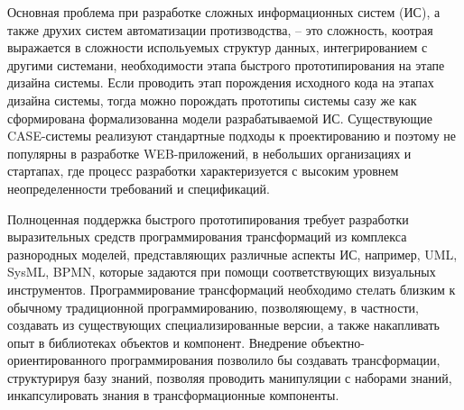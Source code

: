 \documentclass[conference]{IEEEtran} \IEEEoverridecommandlockouts
\begin{document}
Основная проблема при разработке сложных информационных систем (ИС), а также друхих систем автоматизации протизводства, -- это сложность, коотрая выражается в сложности испольуемых структур данных, интегрированием с другими системани, необходимости этапа быстрого прототипирования на этапе дизайна системы. Если проводить этап порождения исходного кода на этапах дизайна системы, тогда можно порождать прототипы системы сазу же как сформирована формализованна модели разрабатываемой ИС. Существующие CASE-системы реализуют стандартные подходы к проектированию и поэтому не популярны в разработке WEB-приложений, в небольших организациях и стартапах, где процесс разработки характеризуется с высоким уровнем неопределенности требований и спецификаций.

Полноценная поддержка быстрого прототипирования требует разработки выразительных средств программирования трансформаций из комплекса разнородных моделей, представляющих различные аспекты ИС, например, UML, SysML, BPMN, которые задаются при помощи соответствующих визуальных инструментов.  Программирование трансформаций необходимо стелать близким к обычному традиционной программированию, позволяющему, в частности, создавать из существующих специализированные версии, а также накапливать опыт в библиотеках объектов и компонент. Внедрение объектно-ориентированного программирования позволило бы создавать трансформации, структурируя базу знаний, позволяя проводить манипуляции с наборами знаний, инкапсулировать знания в трансформационные компоненты.
\end{document}
